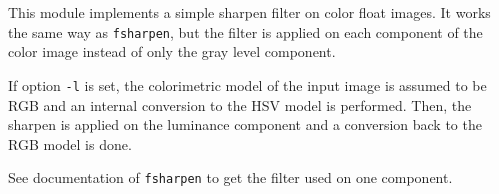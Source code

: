 This module implements a simple sharpen filter on color float images.
It works the same way as {\tt fsharpen}, but the filter is applied
on each component of the color image instead of only the gray level 
component. 

If option {\tt -l} is set, the colorimetric model of the input image is 
assumed to be RGB and an internal conversion to the HSV model is performed.
Then, the sharpen is applied on the luminance component and a conversion
back to the RGB model is done.
 
See documentation of {\tt fsharpen} to get the filter used on one component.




